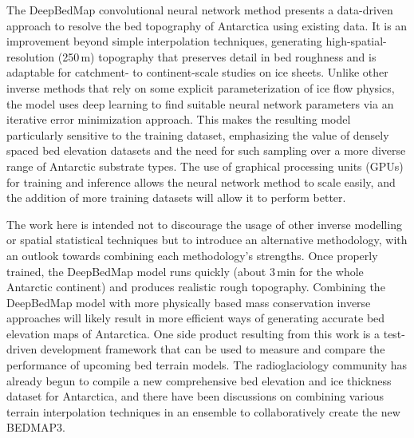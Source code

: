 The DeepBedMap convolutional neural network method presents a data-driven approach to resolve the bed topography of Antarctica using existing data.
It is an improvement beyond simple interpolation techniques, generating high-spatial-resolution (250\,\unit{m}) topography that preserves detail in bed roughness and is adaptable for catchment- to continent-scale studies on ice sheets.
Unlike other inverse methods that rely on some explicit parameterization of ice flow physics, the model uses deep learning to find suitable neural network parameters via an iterative error minimization approach.
This makes the resulting model particularly sensitive to the training dataset, emphasizing the value of densely spaced bed elevation datasets and the need for such sampling over a more diverse range of Antarctic substrate types.
The use of graphical processing units (GPUs) for training and inference allows the neural network method to scale easily, and the addition of more training datasets will allow it to perform better.

The work here is intended not to discourage the usage of other inverse modelling or spatial statistical techniques but to introduce an alternative methodology, with an outlook towards combining each methodology's strengths.
Once properly trained, the DeepBedMap model runs quickly (about 3\,min for the whole Antarctic continent) and produces realistic rough topography.
Combining the DeepBedMap model with more physically based mass conservation inverse approaches \citep[e.g.][]{MorlighemDeepglacialtroughs2019} will likely result in more efficient ways of generating accurate bed elevation maps of Antarctica.
One side product resulting from this work is a test-driven development framework that can be used to measure and compare the performance of upcoming bed terrain models.
The radioglaciology community has already begun to compile a new comprehensive bed elevation and ice thickness dataset for Antarctica, and there have been discussions on combining various terrain interpolation techniques in an ensemble to collaboratively create the new BEDMAP3.



